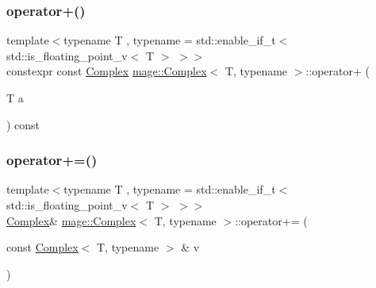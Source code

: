 \subsubsection{\texorpdfstring{operator+()}{operator+()}\hspace{0.1cm}{\footnotesize\ttfamily [3/3]}}
{\footnotesize\ttfamily template$<$typename T , typename  = std\+::enable\+\_\+if\+\_\+t$<$ std\+::is\+\_\+floating\+\_\+point\+\_\+v$<$ T $>$ $>$$>$ \\
constexpr const \mbox{\hyperlink{structmage_1_1_complex}{Complex}} \mbox{\hyperlink{structmage_1_1_complex}{mage\+::\+Complex}}$<$ T, typename $>$\+::operator+ (\begin{DoxyParamCaption}\item[{T}]{a }\end{DoxyParamCaption}) const\hspace{0.3cm}{\ttfamily [noexcept]}}

\mbox{\label{structmage_1_1_complex_a8571adf555e98ae78d6d4549306b95d6}} 
\subsubsection{\texorpdfstring{operator+=()}{operator+=()}\hspace{0.1cm}{\footnotesize\ttfamily [1/2]}}
{\footnotesize\ttfamily template$<$typename T , typename  = std\+::enable\+\_\+if\+\_\+t$<$ std\+::is\+\_\+floating\+\_\+point\+\_\+v$<$ T $>$ $>$$>$ \\
\mbox{\hyperlink{structmage_1_1_complex}{Complex}}\& \mbox{\hyperlink{structmage_1_1_complex}{mage\+::\+Complex}}$<$ T, typename $>$\+::operator+= (\begin{DoxyParamCaption}\item[{const \mbox{\hyperlink{structmage_1_1_complex}{Complex}}$<$ T, typename $>$ \&}]{v }\end{DoxyParamCaption})\hspace{0.3cm}{\ttfamily [noexcept]}}

\mbox{\label{structmage_1_1_complex_a95b1978496b88a5679aeefa2f273a46d}} 
